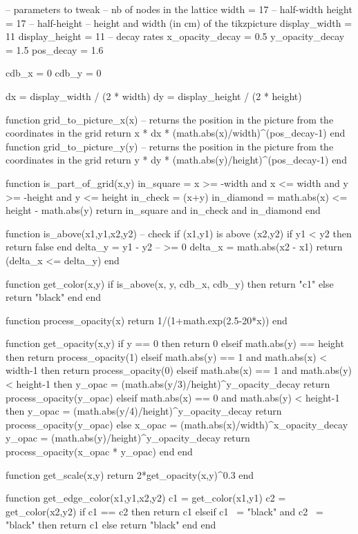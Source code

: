 \begin{luacode}
-- parameters to tweak
-- nb of nodes in the lattice
width = 17 -- half-width
height = 17 -- half-height
-- height and width (in cm) of the tikzpicture
display_width = 11
display_height = 11
-- decay rates 
x_opacity_decay = 0.5
y_opacity_decay = 1.5
pos_decay = 1.6

cdb_x = 0
cdb_y = 0

dx = display_width / (2 * width)
dy = display_height / (2 * height)

function grid_to_picture_x(x)
	-- returns the position in the picture from the coordinates in the grid
	return x * dx * (math.abs(x)/width)^(pos_decay-1)
end 
function grid_to_picture_y(y)
	-- returns the position in the picture from the coordinates in the grid
	return y * dy * (math.abs(y)/height)^(pos_decay-1)
end

function is_part_of_grid(x,y)
	in_square = x >= -width and x <= width and y >= -height and y <= height
	in_check = (x+y)%
	in_diamond = math.abs(x) <= height - math.abs(y)
	return in_square and in_check and in_diamond
end

function is_above(x1,y1,x2,y2) -- check if (x1,y1) is above (x2,y2)
	if y1 < y2 then
		return false
	end
	delta_y = y1 - y2 -- >= 0
	delta_x = math.abs(x2 - x1)
	return (delta_x <= delta_y)
end

function get_color(x,y)
	if is_above(x, y, cdb_x, cdb_y) then
		return "c1"
	else
		return "black" 
	end
end

function process_opacity(x)
	return 1/(1+math.exp(2.5-20*x))
end

function get_opacity(x,y)
	if y == 0 then
		return 0
	elseif math.abs(y) == height then
		return process_opacity(1)
	elseif math.abs(y) == 1 and math.abs(x) < width-1 then
		return process_opacity(0)
	elseif math.abs(x) == 1 and math.abs(y) < height-1 then
		y_opac = (math.abs(y/3)/height)^y_opacity_decay
		return process_opacity(y_opac)
	elseif math.abs(x) == 0 and math.abs(y) < height-1 then
		y_opac = (math.abs(y/4)/height)^y_opacity_decay
		return process_opacity(y_opac)
	else
		x_opac = (math.abs(x)/width)^x_opacity_decay
		y_opac = (math.abs(y)/height)^y_opacity_decay
		return process_opacity(x_opac * y_opac)
	end
end

function get_scale(x,y)
	return 2*get_opacity(x,y)^0.3
end

function get_edge_color(x1,y1,x2,y2)
	c1 = get_color(x1,y1)
	c2 = get_color(x2,y2)
	if c1 == c2 then
		return c1
	elseif c1 ~= "black" and c2 ~= "black" then
		return c1
	else
		return "black"
	end
end


\end{luacode}
